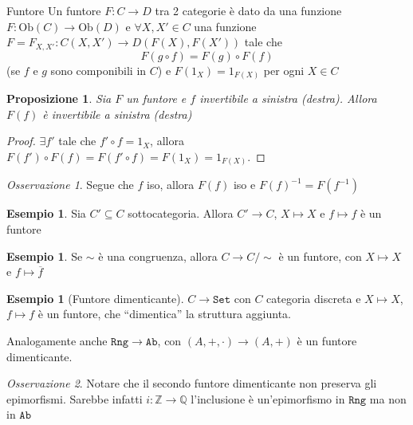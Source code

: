 \documentclass[notitlepage]{report}
\newcounter{theo}[section]\setcounter{theo}{0}
\newcounter{excounter}[section]\setcounter{excounter}{0}
\numberwithin{equation}{section}
\theoremstyle{plain}
\newtheorem{proposition}[theo]{Proposizione}
\theoremstyle{definition}
\newtheorem{example}[excounter]{Esempio}
\theoremstyle{remark}
\newtheorem*{remark}{Osservazione}
\begin{document}
\begin{definition}{Funtore}
    Un funtore \(F : C \to D\) tra 2 categorie è dato da una funzione
    \(F : \mathrm{Ob}{(C)} \to \mathrm{Ob}{(D)}\) e \(\forall X, X' \in C\) una
    funzione \(F = F_{X, X'} : C{(X, X')} \to D{(F{(X)}, F{(X')})}\) tale che
    \[
      F{(g\circ f)} = F{(g)}\circ F{(f)} 
    \]
    (se \(f\) e \(g\) sono componibili in \(C\)) e \(F{(1_X)} = 1_{F{(X)}} \)
    per ogni \(X \in C\) 
    
\end{definition}
\begin{proposition}{}
    Sia \(F\) un funtore e \(f\) invertibile a sinistra (destra). Allora \(F{(f)}\) è invertibile a sinistra (destra)
\end{proposition}
\begin{proof}{}
    \(\exists f'\) tale che \(f' \circ f = 1_X\), allora \(F{(f')} \circ F{(f)} = F{(f'\circ f)} = F{(1_X)} = 1_{F{(X)}} \).
\end{proof}
\begin{remark}{}
    Segue che \(f\) iso, allora \(F{(f)}\) iso e \(F{(f)}^{-1} = F{(f^{-1})}\) 
\end{remark}

\begin{example}{}
    Sia \(C' \subseteq C \) sottocategoria. Allora \(C' \to C\), \(X \mapsto X\) e \(f \mapsto f\) è un funtore
\end{example}

\begin{example}{}
    Se \(\sim \) è una congruenza, allora \(C \to C /\sim\) è un funtore, con
    \(X \mapsto X\) e \(f \mapsto \overline{f}\) 
\end{example}

\begin{example}[Funtore dimenticante]
    \(C \to \mathtt{Set}\) con \(C\) categoria discreta e \(X \mapsto X\), \(f
    \mapsto f\) è un funtore, che ``dimentica'' la struttura aggiunta.

    Analogamente anche \(\mathtt{Rng} \to \mathtt{Ab}\), con \({(A, +, \cdot )} \to {(A, +)}\) è un funtore dimenticante.
\end{example}
\begin{remark}{}
    Notare che il secondo funtore dimenticante non preserva gli epimorfismi.
    Sarebbe infatti \(i : \mathbb{Z} \to \mathbb{Q}\) l'inclusione è
    un'epimorfismo in \(\mathtt{Rng}\) ma non in \(\mathtt{Ab}\) 
\end{remark}
\end{document}
